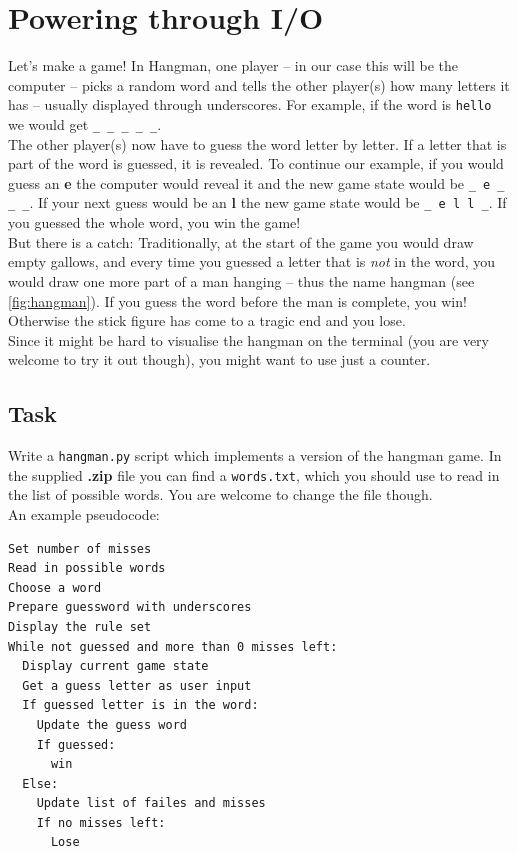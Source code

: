 \section{Powering through I/O}
Let's make a game! In Hangman, one player -- in our case this will be the
computer -- picks a random word and tells the other player(s) how many
letters it has -- usually displayed through underscores. For example, if
the word is \texttt{hello} we would get \verb|_ _ _ _ _|.\\
The other player(s) now have to guess the word letter by letter. If a
letter that is part of the word is guessed, it is revealed. To
continue our example, if you would guess an \textbf{e} the computer would
reveal it and the new game state would be \verb|_ e _ _ _|. If your next
guess would be an \textbf{l} the new game state would be \verb|_ e l l _|.
If you guessed the whole word, you win the game!\\
But there is a catch: Traditionally, at the start of the game you would
draw empty gallows, and every time you guessed a letter that is
\textit{not} in the word, you would draw one more part of a man hanging --
thus the name hangman (see \ref{fig:hangman}). If you guess the word
before the man is complete, you win! Otherwise the stick figure has 
come to a tragic end and you lose.\\
Since it might be hard to visualise the hangman on the terminal (you are 
very welcome to try it out though), you might want to use just a counter.

\subsection*{Task}
Write a \texttt{hangman.py} script which implements a version of the 
hangman game. In the supplied \textbf{.zip} file you can find a 
\texttt{words.txt}, which you should use to read in the list of possible
words. You are welcome to change the file though.\\
An example pseudocode:
\begin{verbatim}
Set number of misses
Read in possible words
Choose a word
Prepare guessword with underscores
Display the rule set
While not guessed and more than 0 misses left:
  Display current game state
  Get a guess letter as user input
  If guessed letter is in the word:
    Update the guess word
    If guessed:
      win
  Else:
    Update list of failes and misses
    If no misses left:
      Lose
\end{verbatim}

